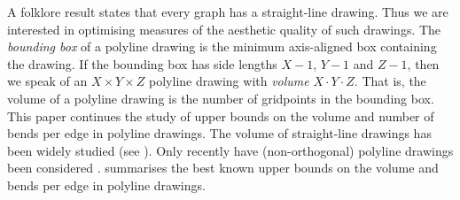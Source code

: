 \documentclass[10pt,twocolumn]{article}
\begin{document}
A folklore result states that every graph has a straight-line drawing. Thus we
are interested in optimising 
measures of the aesthetic quality of such
drawings.  The \emph{bounding box} of a polyline drawing  is the minimum
axis-aligned box containing the drawing. If the bounding box has side lengths
$X-1$, $Y-1$ and $Z-1$, then  we speak of an $X\times Y\times Z$ polyline
drawing with \emph{volume} $X\cdot Y\cdot Z$. That is, the volume of a polyline
drawing is the number of gridpoints in the bounding box.  
This paper continues the study of upper bounds on the volume  and number of
bends per edge in polyline drawings. The volume of straight-line drawings has
been widely studied (see \citep{DujWoo-SubQuad-AMS}).
Only recently have (non-orthogonal) polyline drawings been
considered \citep{DujWoo-Subdivisions,Wismath-TR04}. 
summarises the best known upper bounds on the volume and bends per edge in
polyline drawings. 
\end{document}
